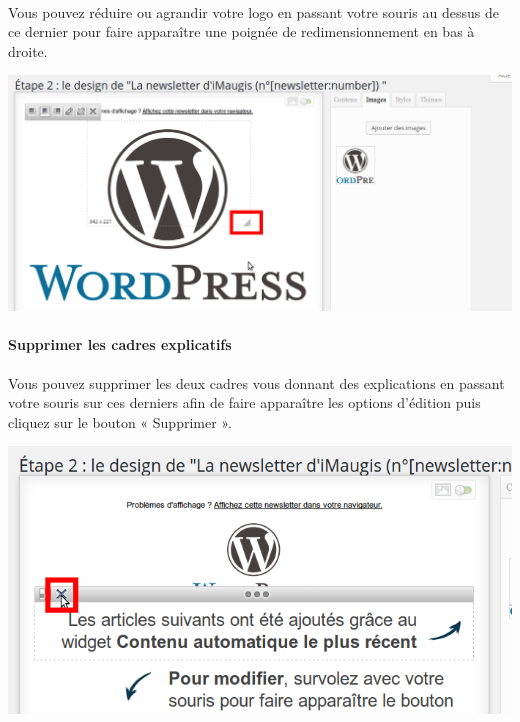 \documentclass[10pt,a4paper]{article}
\begin{document}
\paragraph{}Vous pouvez réduire ou agrandir votre logo en passant votre souris au dessus de ce dernier pour faire apparaître une poignée de redimensionnement en bas à droite.
\begin{center}
\includegraphics[scale=0.3]{img/0224.png}
\end{center}
\paragraph{Supprimer les cadres explicatifs} Vous pouvez supprimer les deux cadres vous donnant des explications en passant votre souris sur ces derniers afin de faire apparaître les options d'édition puis cliquez sur le bouton « Supprimer ».
\begin{center}
\includegraphics[scale=0.3]{img/0225.png}
\end{center}
\end{document}

